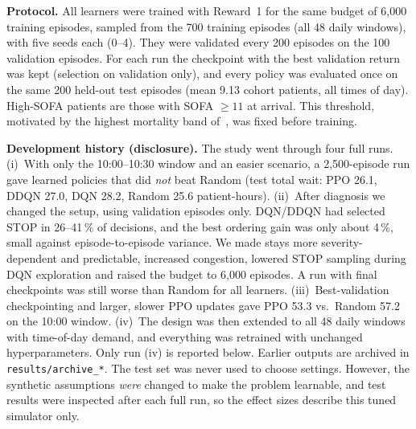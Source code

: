 \documentclass{rlreport}
\begin{document}
\textbf{Protocol.} All learners were trained with Reward~1 for the same budget of 6{,}000 training episodes, sampled from the 700 training episodes (all 48 daily windows), with five seeds each (0--4). They were validated every 200 episodes on the 100 validation episodes. For each run the checkpoint with the best validation return was kept (selection on validation only), and every policy was evaluated once on the same 200 held-out test episodes (mean 9.13 cohort patients, all times of day). High-SOFA patients are those with SOFA $\ge11$ at arrival. This threshold, motivated by the highest mortality band of~\cite{ferreira2001serial}, was fixed before training.

\textbf{Development history (disclosure).} The study went through four full runs. (i)~With only the 10:00--10:30 window and an easier scenario, a 2{,}500-episode run gave learned policies that did \emph{not} beat Random (test total wait: PPO 26.1, DDQN 27.0, DQN 28.2, Random 25.6 patient-hours). (ii)~After diagnosis we changed the setup, using validation episodes only. DQN/DDQN had selected STOP in 26--41\,\% of decisions, and the best ordering gain was only about 4\,\%, small against episode-to-episode variance. We made stays more severity-dependent and predictable, increased congestion, lowered STOP sampling during DQN exploration and raised the budget to 6{,}000 episodes. A run with final checkpoints was still worse than Random for all learners. (iii)~Best-validation checkpointing and larger, slower PPO updates gave PPO 53.3 vs.\ Random 57.2 on the 10:00 window. (iv)~The design was then extended to all 48 daily windows with time-of-day demand, and everything was retrained with unchanged hyperparameters. Only run (iv) is reported below. Earlier outputs are archived in \texttt{results/archive\_*}. The test set was never used to choose settings. However, the synthetic assumptions \emph{were} changed to make the problem learnable, and test results were inspected after each full run, so the effect sizes describe this tuned simulator only.
\end{document}
